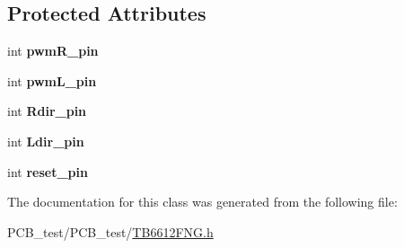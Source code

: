 \subsection*{Protected Attributes}
\begin{DoxyCompactItemize}
\item 
\mbox{\label{classMotorDriver_a1c00b6e8c8f56d316f20cf6f12cb9de2}} 
int {\bfseries pwm\+R\+\_\+pin}
\item 
\mbox{\label{classMotorDriver_a9302f271eff09cfedd12e16720de1824}} 
int {\bfseries pwm\+L\+\_\+pin}
\item 
\mbox{\label{classMotorDriver_a286e7cb87f9bca34e18966cc12d0a81b}} 
int {\bfseries Rdir\+\_\+pin}
\item 
\mbox{\label{classMotorDriver_ad250a07d6eaf7bd79558c0ef7a7876e8}} 
int {\bfseries Ldir\+\_\+pin}
\item 
\mbox{\label{classMotorDriver_a07c7a59a2eb80a2b489fc61145a34bb9}} 
int {\bfseries reset\+\_\+pin}
\end{DoxyCompactItemize}


The documentation for this class was generated from the following file\+:\begin{DoxyCompactItemize}
\item 
P\+C\+B\+\_\+test/\+P\+C\+B\+\_\+test/\hyperlink{TB6612FNG_8h}{T\+B6612\+F\+N\+G.\+h}\end{DoxyCompactItemize}
